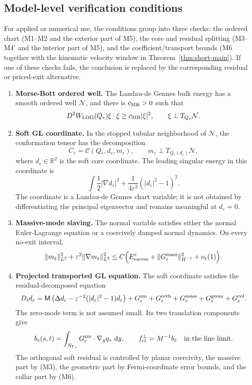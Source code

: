 \documentclass[11pt]{article}
\theoremstyle{definition}
\newcommand{\R}{\mathbb R}
\newcommand{\dd}{\,\mathrm d}
\newcommand{\eps}{\varepsilon}
\newcommand{\Mmob}{\mathsf M}
\begin{document}
\subsection{Model-level verification conditions}

For applied or numerical use, the conditions group into three checks: the
ordered chart (M1--M2 and the exterior part of M5), the core and residual
splitting (M3--M4' and the interior part of M5), and the coefficient/transport
bounds (M6 together with the kinematic velocity window in
Theorem~\ref{thm:short-main}).  If one of these checks fails, the conclusion is
replaced by the corresponding residual or priced-exit alternative.

\begin{enumerate}[label=(M\arabic*)]
\item \textbf{Morse-Bott ordered well.}
The Landau-de Gennes bulk energy has a smooth ordered well \(\mathcal N\), and
there is \(c_{\rm MB}>0\) such that
\[
        D^2W_{\rm LDG}(Q_\ast)\xi\cdot\xi
        \ge c_{\rm MB}|\xi|^2,
        \qquad
        \xi\perp T_{Q_\ast}\mathcal N.
\]

\item \textbf{Soft GL coordinate.}
In the stopped tubular neighborhood of \(\mathcal N\), the conformation tensor
has the decomposition
\[
        C_\eps=\mathcal C(Q_\ast,d_\eps,m_\eps),
        \qquad
        m_\eps\perp T_{Q_\ast(d_\eps)}\mathcal N,
\]
where \(d_\eps\in\R^2\) is the soft core coordinate.  The leading singular
energy in this coordinate is
\[
        \int
        \frac12|\nabla d_\eps|^2
        +\frac{1}{4\eps^2}(|d_\eps|^2-1)^2 .
\]
The coordinate is a Landau-de Gennes chart variable; it is not obtained by
differentiating the principal eigenvector and remains meaningful at
\(d_\eps=0\).

\item \textbf{Massive-mode slaving.}
The normal variable satisfies either the normal Euler-Lagrange equation or a
coercively damped normal dynamics.  On every no-exit interval,
\[
        \|m_\eps\|_{L^2}^2+
        \eps^2\|\nabla m_\eps\|_{L^2}^2
        \le
        C\Bigl(E_{\rm excess}^\eps
        +\|G_\eps^{\rm mass}\|_{H^{-1}}^2
        +o_\eps(1)\Bigr).
\]

\item \textbf{Projected transported GL equation.}
The soft coordinate satisfies the residual-decomposed equation
\begin{equation}\label{eq:verified-projected-gl}
        D_t d_\eps
        =
        \Mmob\left(\Delta d_\eps
        -\eps^{-2}(|d_\eps|^2-1)d_\eps\right)
        +G_\eps^{\rm zm}+G_\eps^{\rm orth}
        +G_\eps^{\rm mass}+G_\eps^{\rm geom}+G_\eps^{\rm col}.
\end{equation}
The zero-mode term is not assumed small.  Its two translation components give
\[
        b_\eps(s,t)=
        \int_{N_{\Gamma_s}}
        G_\eps^{\rm zm}\cdot\nabla_y q_\ast\,\dd y,
        \qquad
        f_{\rm cl}^\perp=M^{-1}b_\eps
        \quad\hbox{in the line limit}.
\]
The orthogonal soft residual is controlled by planar coercivity, the massive
part by (M3), the geometric part by Fermi-coordinate error bounds, and the
collar part by (M6).


\end{enumerate}
\end{document}
